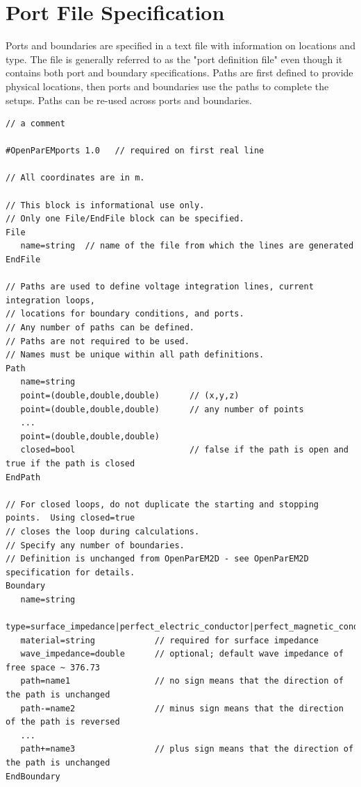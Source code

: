 \documentclass[titlepage]{article}
\renewcommand\_{\textunderscore\linebreak[1]}
\begin{document}
\newpage
\section{Port File Specification}
\label{sec:port_file_spec}

Ports and boundaries are specified in a text file with information on locations and type. The file is generally referred to as the "port definition file" even though it contains both port and boundary specifications.  Paths are first defined to provide physical locations, then ports and boundaries use the paths to complete the setups.  Paths can be re-used across ports and boundaries.
\newline

\begin{Verbatim}[fontsize=\small]
// a comment

#OpenParEMports 1.0   // required on first real line

// All coordinates are in m.

// This block is informational use only.
// Only one File/EndFile block can be specified.
File
   name=string  // name of the file from which the lines are generated
EndFile

// Paths are used to define voltage integration lines, current integration loops, 
// locations for boundary conditions, and ports.
// Any number of paths can be defined.
// Paths are not required to be used.
// Names must be unique within all path definitions.
Path
   name=string
   point=(double,double,double)      // (x,y,z)
   point=(double,double,double)      // any number of points
   ...
   point=(double,double,double)
   closed=bool                       // false if the path is open and true if the path is closed
EndPath

// For closed loops, do not duplicate the starting and stopping points.  Using closed=true
// closes the loop during calculations.
// Specify any number of boundaries.
// Definition is unchanged from OpenParEM2D - see OpenParEM2D specification for details.
Boundary
   name=string
   type=surface_impedance|perfect_electric_conductor|perfect_magnetic_conductor|radiation
   material=string            // required for surface impedance
   wave_impedance=double      // optional; default wave impedance of free space ~ 376.73
   path=name1                 // no sign means that the direction of the path is unchanged    
   path-=name2                // minus sign means that the direction of the path is reversed
   ...
   path+=name3                // plus sign means that the direction of the path is unchanged
EndBoundary


\end{Verbatim}
\end{document}
